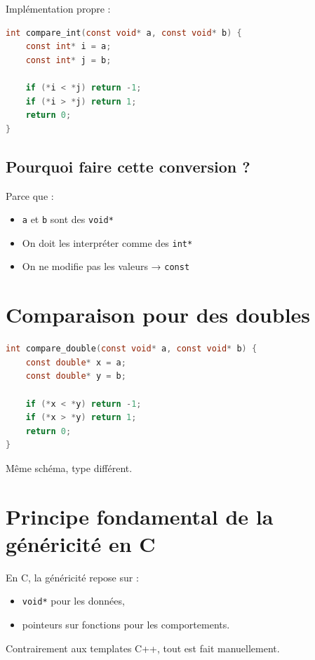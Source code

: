 Implémentation propre :

\begin{lstlisting}[language=C]
int compare_int(const void* a, const void* b) {
    const int* i = a;
    const int* j = b;

    if (*i < *j) return -1;
    if (*i > *j) return 1;
    return 0;
}
\end{lstlisting}

\subsection{Pourquoi faire cette conversion ?}

Parce que :

\begin{itemize}
\item \texttt{a} et \texttt{b} sont des \texttt{void*}
\item On doit les interpréter comme des \texttt{int*}
\item On ne modifie pas les valeurs → \texttt{const}
\end{itemize}

\section{Comparaison pour des doubles}

\begin{lstlisting}[language=C]
int compare_double(const void* a, const void* b) {
    const double* x = a;
    const double* y = b;

    if (*x < *y) return -1;
    if (*x > *y) return 1;
    return 0;
}
\end{lstlisting}

Même schéma, type différent.

\section{Principe fondamental de la généricité en C}

En C, la généricité repose sur :

\begin{itemize}
\item \texttt{void*} pour les données,
\item pointeurs sur fonctions pour les comportements.
\end{itemize}

Contrairement aux templates C++,
tout est fait manuellement.

